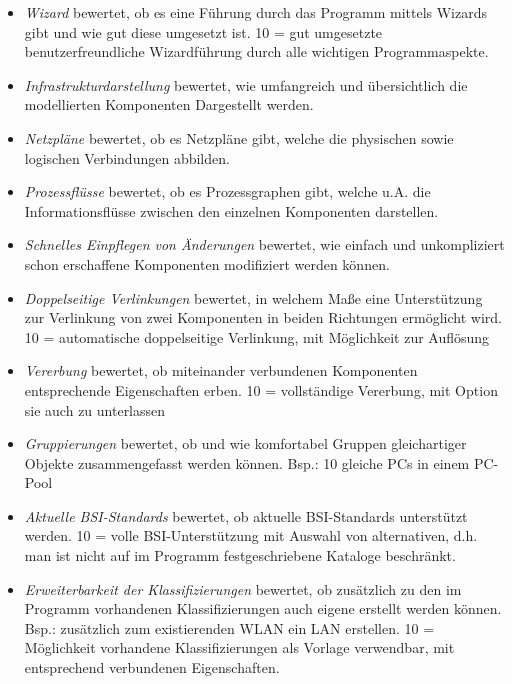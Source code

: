 \begin{itemize}
	\item \textit{Wizard} bewertet, ob es eine Führung durch das Programm mittels Wizards gibt und wie gut diese umgesetzt ist. 10 = gut umgesetzte benutzerfreundliche Wizardführung durch alle wichtigen Programmaspekte.

	\item \textit{Infrastrukturdarstellung} bewertet, wie umfangreich und übersichtlich die modellierten Komponenten Dargestellt werden.

	\item \textit{Netzpläne} bewertet, ob es Netzpläne gibt, welche die physischen sowie logischen Verbindungen abbilden.

	\item \textit{Prozessflüsse} bewertet, ob es Prozessgraphen gibt, welche u.A. die Informationsflüsse zwischen den einzelnen Komponenten darstellen.
	\item \textit{Schnelles Einpflegen von Änderungen} bewertet, wie einfach und unkompliziert schon erschaffene Komponenten modifiziert werden können.

	\item \textit{Doppelseitige Verlinkungen} bewertet, in welchem Maße eine Unterstützung zur Verlinkung von zwei Komponenten in beiden Richtungen ermöglicht wird. 10 = automatische doppelseitige Verlinkung, mit Möglichkeit zur Auflösung

	\item \textit{Vererbung}  bewertet, ob miteinander verbundenen Komponenten entsprechende Eigenschaften erben. 10 = vollständige Vererbung, mit Option sie auch zu unterlassen

	\item \textit{Gruppierungen} bewertet, ob und wie komfortabel Gruppen gleichartiger Objekte zusammengefasst werden können. Bsp.: 10 gleiche PCs in einem PC-Pool

	\item \textit{Aktuelle BSI-Standards} bewertet, ob aktuelle BSI-Standards unterstützt werden. 10 = volle BSI-Unterstützung mit Auswahl von alternativen, d.h. man ist nicht auf im Programm festgeschriebene Kataloge beschränkt.

	\item \textit{Erweiterbarkeit der Klassifizierungen} bewertet, ob zusätzlich zu den im Programm vorhandenen Klassifizierungen auch eigene erstellt werden können. Bsp.: zusätzlich zum existierenden WLAN ein LAN erstellen. 10 = Möglichkeit vorhandene Klassifizierungen als Vorlage verwendbar, mit entsprechend verbundenen Eigenschaften.


\end{itemize}
